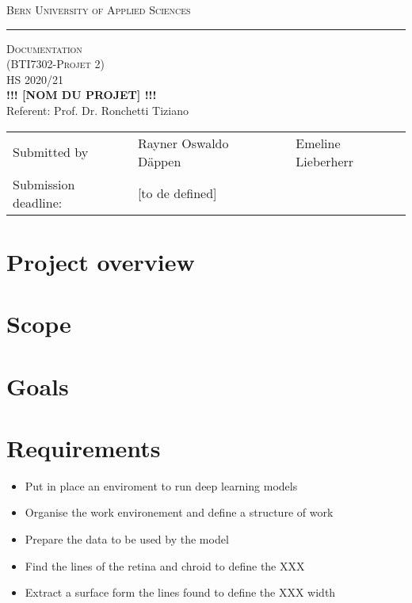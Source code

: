 \documentclass[12pt,a4paper]{article}
\begin{document}
\thispagestyle{empty}
\vspace*{-3cm}
\begin{center}
\large \textsc{Bern University of Applied Sciences}
\vspace{0.5cm}
\hrule
\vspace{5.5cm}
{\Large \textsc{Documentation\\
(BTI7302-Projet 2)}}\\
{\large HS 2020/21}\\
\vspace{1cm}
{\Large \bf
!!! [NOM DU PROJET] !!!}\\
\vspace*{1cm}
{\large Referent:  Prof. Dr. Ronchetti Tiziano}
\end{center}
\vspace*{5cm}
{\large

\hspace*{7cm}
\parbox{8.2cm}
{
\begin{tabular}{ll}
Submitted by & Rayner Oswaldo Däppen && Emeline Lieberherr\\

Submission deadline: & [to de defined]

\end{tabular}}}

\newpage
{}
\tableofcontents

\newpage
{}
\section{Project overview}\label{Project overview}

\section{Scope}\label{Scope}

\section{Goals}\label{Goals}

\section{Requirements}\label{Requirements}


\begin{itemize}
  \item Put in place an enviroment to run deep learning models
  \item Organise the work environement and define a structure of work
  \item Prepare the data to be used by the model
  \item Find the lines of the retina and chroid to define the XXX
  \item Extract a surface form the lines found to define the XXX width
\end{itemize}
\end{document}

